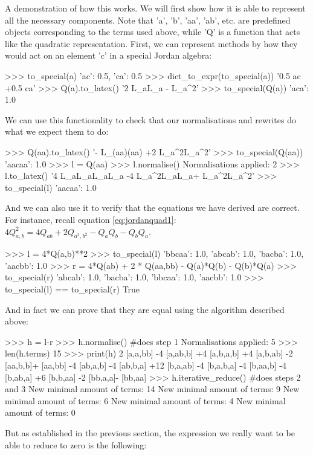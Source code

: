 \documentclass{article}
\begin{document}
A demonstration of how this works. We will first show how it is able to represent all the necessary components. Note that 'a', 'b', 'aa', 'ab', etc. are predefined objects corresponding to the terms used above, while 'Q' is a function that acts like the quadratic representation.
First, we can represent methods by how they would act on an element 'c' in a special Jordan algebra:
\begin{python}
    >>> to_special(a)
    {'ac': 0.5, 'ca': 0.5}
    >>> dict_to_expr(to_special(a))
    '0.5 ac +0.5 ca'
    >>> Q(a).to_latex()
    '2 L_aL_a - L_{a^2}'
    >>> to_special(Q(a))
    {'aca': 1.0}
\end{python}
We can use this functionality to check that our normalisations and rewrites do what we expect them to do:
\begin{python}
    >>> Q(aa).to_latex()
    '- L_{(aa)(aa)} +2 L_{a^2}L_{a^2}'
    >>> to_special(Q(aa))
    {'aacaa': 1.0}
    >>> l = Q(aa)
    >>> l.normalise()
    Normalisations applied: 2
    >>> l.to_latex()
    '4 L_aL_aL_aL_a -4 L_{a^2}L_aL_a+ L_{a^2}L_{a^2}'
    >>> to_special(l)
    {'aacaa': 1.0}
\end{python}
And we can also use it to verify that the equations we have derived are correct. For instance, recall equation \eqref{eq:jordanquad1}: $4Q_{a,b}^2 = 4Q_{ab} + 2Q_{a^2,b^2} -Q_aQ_b - Q_bQ_a$.
\begin{python}
    >>> l = 4*Q(a,b)**2
    >>> to_special(l)
    {'bbcaa': 1.0, 'abcab': 1.0, 'bacba': 1.0, 'aacbb': 1.0}
    >>> r = 4*Q(ab) + 2 * Q(aa,bb) - Q(a)*Q(b) - Q(b)*Q(a)
    >>> to_special(r)
    {'abcab': 1.0, 'bacba': 1.0, 'bbcaa': 1.0, 'aacbb': 1.0}
    >>> to_special(l) == to_special(r)
    True
\end{python}
And in fact we can prove that they are equal using the algorithm described above:
\begin{python}
    >>> h = l-r
    >>> h.normalise() #does step 1
    Normalisations applied: 5
    >>> len(h.terms)
    15
    >>> print(h)
    2 [a,a,bb] -4 [a,ab,b] +4 [a,b,a,b] +4 [a,b,ab] 
    -2 [aa,b,b]+ [aa,bb] -4 [ab,a,b] -4 [ab,b,a] 
    +12 [b,a,ab] -4 [b,a,b,a] -4 [b,aa,b] -4 [b,ab,a] 
    +6 [b,b,aa] -2 [bb,a,a]- [bb,aa]
    >>> h.iterative_reduce() #does steps 2 and 3
    New minimal amount of terms: 14
    New minimal amount of terms: 9
    New minimal amount of terms: 6
    New minimal amount of terms: 4
    New minimal amount of terms: 0
\end{python}
But as established in the previous section, the expression we really want to be able to reduce to zero is the following:
\end{document}

